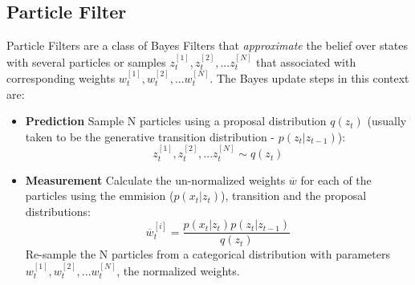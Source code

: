 \documentclass[10pt,twocolumn,letterpaper]{article}
\begin{document}
	\subsection{Particle Filter}
	Particle Filters are a class of Bayes Filters that \emph{approximate} the belief over states with several particles or samples ${z^{[1]}_t, z^{[2]}_t, ... z^{[N]}_t}$ that associated with corresponding weights ${w^{[1]}_t, w^{[2]}_t, ... w^{[N]}_t}$. The Bayes update steps in this context are:
	
	\begin{itemize}
		\item \textbf{Prediction} Sample N particles using a proposal distribution $q(z_t)$ (usually taken to be the generative transition distribution - $p(z_t|z_{t-1})$):
		\begin{equation}
		{z^{[1]}_t, z^{[2]}_t, ... z^{[N]}_t} \sim q(z_t)
		\end{equation}
		
		\item \textbf{Measurement} Calculate the un-normalized weights $\overline{w}$ for each of the particles using the emmision ($p(x_t|z_t)$), transition and the proposal distributions:
		\begin{equation}
		\overline{w}^{[i]}_t = \frac{p(x_t|z_t)p(z_t|z_{t-1})}{q(z_t)}
		\end{equation}
		Re-sample the N particles from a categorical distribution with parameters ${w^{[1]}_t, w^{[2]}_t, ... w^{[N]}_t}$, the normalized weights.  
		
	\end{itemize}
	
\end{document}
